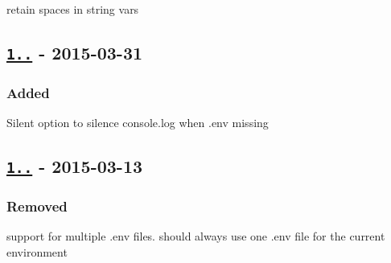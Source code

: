 \begin{DoxyItemize}
\item retain spaces in string vars
\end{DoxyItemize}

\subsection*{\href{https://github.com/motdotla/dotenv/compare/v1.0.0...v1.1.0}{\tt 1..} -\/ 2015-\/03-\/31}

\subsubsection*{Added}


\begin{DoxyItemize}
\item Silent option to silence {\ttfamily console.\+log} when {\ttfamily .env} missing
\end{DoxyItemize}

\subsection*{\href{https://github.com/motdotla/dotenv/compare/v0.4.0...v1.0.0}{\tt 1..} -\/ 2015-\/03-\/13}

\subsubsection*{Removed}


\begin{DoxyItemize}
\item support for multiple {\ttfamily .env} files. should always use one {\ttfamily .env} file for the current environment 
\end{DoxyItemize}